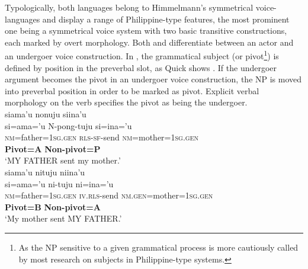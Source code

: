 Typologically, both languages belong to Himmelmann's symmetrical voice-languages and display a range of Philippine-type features, the most prominent one being a symmetrical voice system with two basic transitive constructions, each marked by overt morphology. Both  and  differentiate between an actor and an undergoer voice construction. In , the grammatical subject (or pivot\footnote{As the NP sensitive to a given grammatical process is more cautiously called by most research on subjects in Philippine-type systems.}) is defined by position in the preverbal slot, as Quick shows \citep[124]{Quick2007}. If the undergoer argument becomes the pivot in an undergoer voice construction, the NP is moved into preverbal position in order to be marked as pivot. Explicit verbal morphology on the verb specifies the pivot as being the undergoer.
\largerpage[1]
\ea 
{}\\
\ea \label{Pendau_ex1}
\gllll siama'u nonuju siina'u \\
si=ama='u N-pong-tuju si=ina='u \\
 \textsc{nm}=father=\textsc{1}\textsc{sg}.\textsc{gen} \textsc{rls}-\textsc{sf}-send \textsc{nm}=mother=\textsc{1}\textsc{sg}.\textsc{gen} \\
 \textbf{Pivot=A} {} \textbf{Non-pivot=P} \\
\glft `MY FATHER sent my mother.' \\ 
\ex \label{Pendau_ex2}
\gllll siama'u nituju niina'u \\
si=ama='u ni-tuju ni=ina='u \\
 \textsc{nm}=father=\textsc{1}\textsc{sg}.\textsc{gen} \textsc{iv}.\textsc{rls}-send \textsc{nm}.\textsc{gen}=mother=\textsc{1}\textsc{sg}.\textsc{gen} \\
 \textbf{Pivot=B} {} \textbf{Non-pivot=A} \\
\glft `My mother sent MY FATHER.'\\ 
\z
\z


